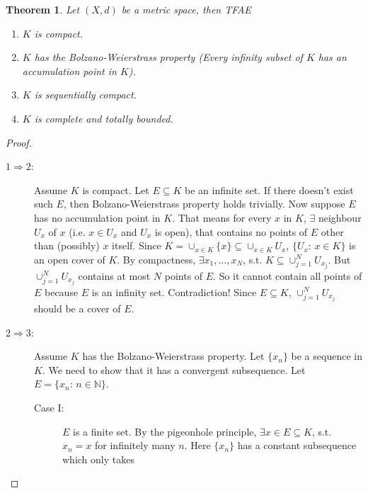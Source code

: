 \documentclass[12pt]{article}
\theoremstyle{plain}
\newtheorem{thm}{Theorem}
\theoremstyle{definition}
\begin{document}
\begin{thm}
    Let $(X,d)$ be a metric space, then TFAE
    \begin{enumerate}
        \item
            $K$ is compact.
        \item
            $K$ has the Bolzano-Weierstrass property
            (Every infinity subset of $K$ has an accumulation point in $K$).
        \item
            $K$ is sequentially compact.
        \item
            $K$ is complete and totally bounded.
    \end{enumerate}
\end{thm}

\begin{proof}
    \begin{description}
        \item[$1\Rightarrow 2$:]
            Assume $K$ is compact.
            Let $E\subseteq K$ be an infinite set.
            If there doesn't exist such $E$, then Bolzano-Weierstrass property
            holds trivially.
            Now suppose $E$ has no accumulation point in $K$.
            That means for every $x$ in $K$, $\exists$ neighbour $U_x$ of $x$
            (i.e. $x\in U_x$ and $U_x$ is open), that contains no points of $E$
            other than (possibly) $x$ itself.
            Since $K=\cup_{x\in K}\{x\}\subseteq\cup_{x\in K} U_x$, $\{U_x:\,x\in
            K\}$ is an open cover of $K$.
            By compactness, $\exists x_1,\ldots,x_N$, s.t. $K\subseteq\cup_{j=1}^N
            U_{x_j}$.
            But $\cup_{j=1}^N U_{x_j}$ contains at most $N$ points of $E$.
            So it cannot contain all points of $E$ because $E$ is an infinity
            set.
            Contradiction! Since $E\subseteq K$, $\cup_{j=1}^N U_{x_j}$ should
            be a cover of $E$.
        \item[$2\Rightarrow 3$:]
            Assume $K$ has the Bolzano-Weierstrass property.
            Let $\{x_n\}$ be a sequence in $K$. We need to show that it has a
            convergent subsequence.
            Let $E=\{x_n:\,n\in\mathbb{N}\}$.
            \begin{description}
                \item[Case I:]
                    $E$ is a finite set.
                    By the pigeonhole principle, $\exists x\in E\subseteq K$,
                    s.t. $x_n=x$ for infinitely many $n$.
                    Here $\{x_n\}$ has a constant subsequence which only takes

\end{description}
\end{description}
\end{proof}
\end{document}
